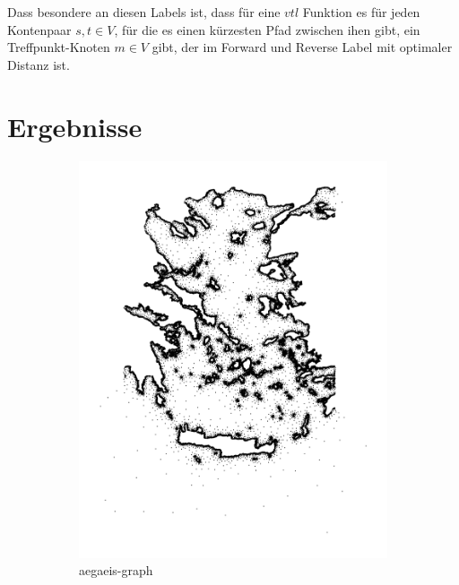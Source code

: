 Dass besondere an diesen Labels ist, dass für eine ${vtl}$ Funktion es für jeden Kontenpaar $s, t \in V$, für die es einen kürzesten Pfad zwischen ihen gibt, ein Treffpunkt-Knoten $m \in V$ gibt, der im Forward und Reverse Label mit optimaler Distanz ist.

\chapter{Ergebnisse}


\begin{figure}[ht]
    \centering
    \begin{subfigure}[b]{0.35\textwidth}
        \centering
        \includegraphics[width=\textwidth]{img/base_graphs/aegaeis-ref-graph.png}
        \caption{aegaeis-graph}
    \end{subfigure}
    \hfill
    \begin{subfigure}[b]{0.35\textwidth}
        \centering

\end{subfigure}
\end{figure}
